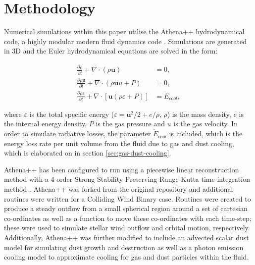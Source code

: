 
\section{Methodology}

Numerical simulations within this paper utilise the Athena++ hydrodynamical code, a highly modular modern fluid dynamics code \parencite{stoneAthenaAdaptiveMesh2020}.
Simulations are generated in 3D and the Euler hydrodynamical equations are solved in the form:

\begin{subequations}
  \begin{align}
    \frac{\partial\rho}{\partial t}+\nabla \cdot \left(\rho \boldsymbol{u}\right) & = 0 , \\
    \frac{\partial \rho \boldsymbol{u}}{\partial t} + \nabla \cdot \left(\rho \boldsymbol{u} u + P \right) & = 0, \\
    \frac{\partial \rho \varepsilon}{\partial t} + \nabla \cdot \left[ \boldsymbol{u} \left( \rho\varepsilon + P \right) \right] & = \dot E_{cool} , 
  \end{align}
\end{subequations}

\noindent
where $\varepsilon$ is the total specific energy ($\varepsilon = \boldsymbol{u}^2/2 + e/\rho $, $\rho$) is the mass density, $e$ is the internal energy density, $P$ is the gas pressure and $u$ is the gas velocity.
In order to simulate radiative losses, the parameter $\dot E_{cool}$ is included, which is the energy loss rate per unit volume from the fluid due to gas and dust cooling, which is elaborated on in section \ref{sec:gas-dust-cooling}.


Athena++ has been configured to run using a piecewise linear reconstruction method with a 4 order Strong Stability Preserving Runge-Kutta time-integration method \parencite{spiteriNewClassOptimal2002}.
Athena++ was forked from the original repository and additional routines were written for a Colliding Wind Binary case.
Routines were created to produce a steady outflow from a small spherical region around a set of cartesian co-ordinates as well as a function to move these co-ordinates with each time-step; these were used to simulate stellar wind outflow and orbital motion, respectively.
Additionally, Athena++ was further modified to include an advected scalar dust model for simulating dust growth and destruction as well as a photon emission cooling model to approximate cooling for gas and dust particles within the fluid.

